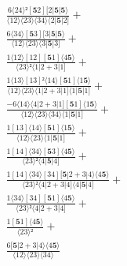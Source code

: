 \documentclass[varwidth, border=5pt]{standalone}
\begin{document}
\begin{my}
$\begin{gathered}
\scriptscriptstyle\frac{6⟨24⟩²[𝟓2][2|𝟓|𝟓⟩}{⟨12⟩⟨23⟩⟨34⟩⟨2|𝟓|2]} +\\
\scriptscriptstyle\frac{6⟨34⟩[𝟓3][3|𝟓|𝟓⟩}{⟨12⟩⟨23⟩⟨3|𝟓|3]} +\\
\scriptscriptstyle\frac{1⟨12⟩[12][𝟓1]⟨4𝟓⟩}{⟨23⟩²⟨1|2+3|1]} +\\
\scriptscriptstyle\frac{1⟨13⟩[13]²⟨14⟩[𝟓1]⟨1𝟓⟩}{⟨12⟩⟨23⟩⟨1|2+3|1]⟨1|𝟓|1]} +\\
\scriptscriptstyle\frac{-6⟨14⟩⟨4|2+3|1][𝟓1]⟨1𝟓⟩}{⟨12⟩⟨23⟩⟨34⟩⟨1|𝟓|1]} +\\
\scriptscriptstyle\frac{1[13]⟨14⟩[𝟓1]⟨1𝟓⟩}{⟨12⟩⟨23⟩⟨1|𝟓|1]} +\\
\scriptscriptstyle\frac{1[14]⟨34⟩[𝟓3]⟨4𝟓⟩}{⟨23⟩²⟨4|𝟓|4]} +\\
\scriptscriptstyle\frac{1[14]⟨34⟩[34][𝟓|2+3|4⟩⟨4𝟓⟩}{⟨23⟩²⟨4|2+3|4]⟨4|𝟓|4]} +\\
\scriptscriptstyle\frac{1⟨34⟩[34][𝟓1]⟨4𝟓⟩}{⟨23⟩²⟨4|2+3|4]} +\\
\scriptscriptstyle\frac{1[𝟓1]⟨4𝟓⟩}{⟨23⟩²} +\\
\scriptscriptstyle\frac{6[𝟓|2+3|4⟩⟨4𝟓⟩}{⟨12⟩⟨23⟩⟨34⟩} \phantom{+}
\end{gathered}$
\end{my}
\end{document}
